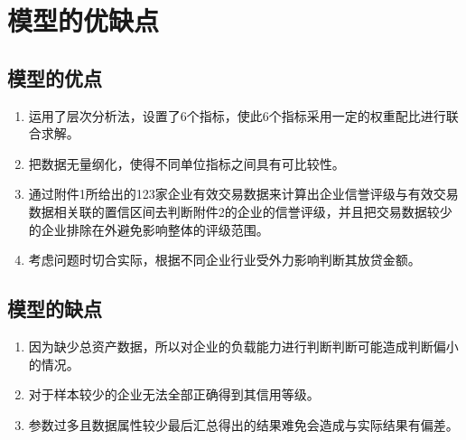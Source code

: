 \documentclass[dvipsnames,withoutpreface,bwprint]{cumcmthesis}
\begin{document}
\section{模型的优缺点}
\subsection{模型的优点}
\begin{enumerate}[label=(\arabic*)]
    \item 运用了层次分析法，设置了6个指标，使此6个指标采用一定的权重配比进行联合求解。
    \item 把数据无量纲化，使得不同单位指标之间具有可比较性。
    \item 通过附件1所给出的123家企业有效交易数据来计算出企业信誉评级与有效交易数据相关联的置信区间去判断附件2的企业的信誉评级，并且把交易数据较少的企业排除在外避免影响整体的评级范围。
    \item 考虑问题时切合实际，根据不同企业行业受外力影响判断其放贷金额。
\end{enumerate}
\subsection{模型的缺点}
\begin{enumerate}[label=(\arabic*)]
    \item 因为缺少总资产数据，所以对企业的负载能力进行判断判断可能造成判断偏小的情况。
    \item 对于样本较少的企业无法全部正确得到其信用等级。
    \item 参数过多且数据属性较少最后汇总得出的结果难免会造成与实际结果有偏差。
\end{enumerate}
\newpage
\end{document}
